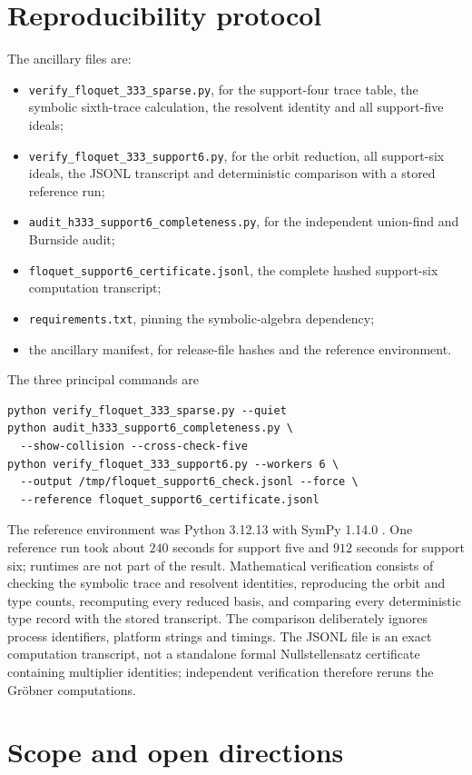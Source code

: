 \documentclass[11pt,reqno]{amsart}
\theoremstyle{definition}
\theoremstyle{remark}
\begin{document}
\section{Reproducibility protocol}

The ancillary files are:
\begin{itemize}[leftmargin=2em]
\item \texttt{verify\_floquet\_333\_sparse.py}, for the support-four trace
table, the symbolic sixth-trace calculation, the resolvent identity and all
support-five ideals;
\item \texttt{verify\_floquet\_333\_support6.py}, for the orbit reduction,
all support-six ideals, the JSONL transcript and deterministic comparison
with a stored reference run;
\item \texttt{audit\_h333\_support6\_completeness.py}, for the independent
union-find and Burnside audit;
\item \texttt{floquet\_support6\_certificate.jsonl}, the complete hashed
support-six computation transcript;
\item \texttt{requirements.txt}, pinning the symbolic-algebra dependency;
\item the ancillary manifest, for release-file hashes and the reference
environment.
\end{itemize}
The three principal commands are
\begin{verbatim}
python verify_floquet_333_sparse.py --quiet
python audit_h333_support6_completeness.py \
  --show-collision --cross-check-five
python verify_floquet_333_support6.py --workers 6 \
  --output /tmp/floquet_support6_check.jsonl --force \
  --reference floquet_support6_certificate.jsonl
\end{verbatim}
The reference environment was Python 3.12.13 with SymPy 1.14.0
\cite{sympy}.  One reference run took about $240$ seconds for support five
and $912$ seconds for support six; runtimes are not part of the result.
Mathematical verification consists of checking the symbolic trace and
resolvent identities, reproducing the orbit and type counts, recomputing
every reduced basis, and comparing every deterministic type record with the
stored transcript.  The comparison deliberately ignores process identifiers,
platform strings and timings.  The JSONL file is an exact computation
transcript, not a standalone formal Nullstellensatz certificate containing
multiplier identities; independent verification therefore reruns the
Gr\"obner computations.

\Needspace{8\baselineskip}
\section{Scope and open directions}
\end{document}

